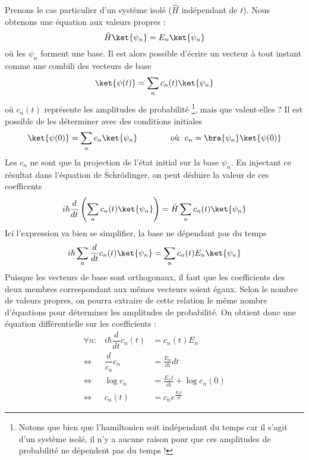 Prenons le cas particulier d'un système isolé ($\hat{H}$ indépendant de $t$).
Nous obtenons une équation aux valeurs propres :
\begin{equation}
\hat{H}\ket{\psi_n} = E_n\ket{\psi_n}
\end{equation}
où les $\psi_n$ forment une base. Il est alors possible d'écrire un vecteur à tout 
instant comme une combili des vecteurs de base
\begin{equation}
\ket{\psi(t)} = \sum_n c_n(t)\ket{\psi_n}
\end{equation}
où $c_n(t)$ représente les amplitudes de probabilité \footnote{Notons que bien que l'hamiltonien
soit indépendant du temps car il s'agit d'un système isolé, il n'y a aucune raison pour que ces
amplitudes de probabilité ne dépendent pas du temps !}, mais que valent-elles ? Il est 
possible de les déterminer avec des conditions initiales
\begin{equation}
\ket{\psi(0)} = \sum_n c_n\ket{\psi_n}\qquad\qquad \text{où }\ c_n = \bra{\psi_n}\ket{\psi(0)}
\end{equation}
Les $c_n$ ne sont que la projection de l'état initial sur la base $\psi_n$. En injectant ce 
résultat dans l'équation de Schrödinger, on peut déduire la valeur de ces coefficents
\begin{equation}
i\hbar\dfrac{d}{dt}\left(\sum_n c_n(t)\ket{\psi_n}\right) = \hat{H}\sum_n c_n(t)\ket{\psi_n}
\end{equation}
Ici l'expression va bien se simplifier, la base ne dépendant pas du temps
\begin{equation}
i\hbar \sum_n \dfrac{d}{dt}c_n(t)\ket{\psi_n} = \sum_n c_n(t)E_n\ket{\psi_n}
\end{equation}
Puisque les vecteurs de base sont orthogonaux, il faut que les coefficients
des deux membres correspondant aux mêmes vecteurs soient égaux.
Selon le nombre de valeurs propres, on pourra extraire de cette relation le même nombre 
d'équations pour déterminer les amplitudes de probabilité.
On obtient donc une équation différentielle sur les coefficients :
\begin{equation}
\begin{array}{lll}
\forall n: &i\hbar \dfrac{d}{dt}c_n(t) &= c_n(t)E_n\\
 \Leftrightarrow & \dfrac{d}{c_n}c_n &= \frac{E_n}{i\hbar}dt\\
 \Leftrightarrow & \log c_n &= \frac{E_nt}{i\hbar} + \log c_n(0)\\
 \Leftrightarrow & c_n(t) &= c_n e^{\frac{E_nt}{i\hbar}}
\end{array}
\end{equation}

